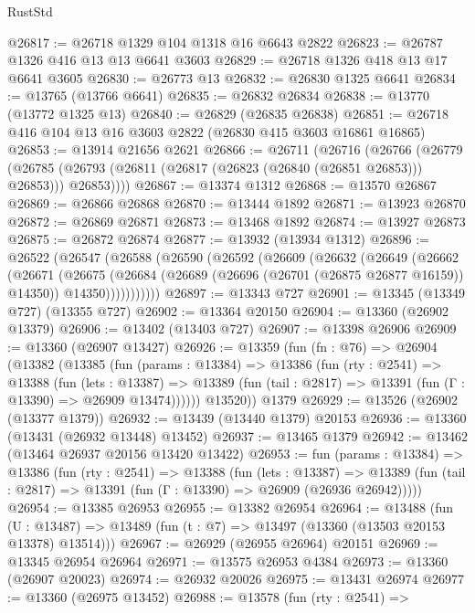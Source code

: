 \begin{lexlean}{RustStd}
\begin{coremodule}
@26817 := @26718 @1329 @104 @1318 @16 @6643 @2822
@26823 := @26787 @1326 @416 @13 @13 @6641 @3603
@26829 := @26718 @1326 @418 @13 @17 @6641 @3605
@26830 := @26773 @13
@26832 := @26830 @1325 @6641
@26834 := @13765 (@13766 @6641)
@26835 := @26832 @26834
@26838 := @13770 (@13772 @1325 @13)
@26840 := @26829 (@26835 @26838)
@26851 := @26718 @416 @104 @13 @16 @3603 @2822 (@26830 @415 @3603 @16861 @16865)
@26853 := @13914 @21656 @2621
@26866 := @26711
    (@26716
      (@26766
        (@26779
          (@26785 (@26793 (@26811 (@26817 (@26823 (@26840 (@26851 @26853))) @26853))) @26853))))
@26867 := @13374 @1312
@26868 := @13570 @26867
@26869 := @26866 @26868
@26870 := @13444 @1892
@26871 := @13923 @26870
@26872 := @26869 @26871
@26873 := @13468 @1892
@26874 := @13927 @26873
@26875 := @26872 @26874
@26877 := @13932 (@13934 @1312)
@26896 := @26522
    (@26547
      (@26588
        (@26590
          (@26592
            (@26609
              (@26632
                (@26649
                  (@26662
                    (@26671
                      (@26675
                        (@26684
                          (@26689 (@26696 (@26701 (@26875 @26877 @16159)) @14350))
                          @14350)))))))))))
@26897 := @13343 @727
@26901 := @13345 (@13349 @727) (@13355 @727)
@26902 := @13364 @20150
@26904 := @13360 (@26902 @13379)
@26906 := @13402 (@13403 @727)
@26907 := @13398 @26906
@26909 := @13360 (@26907 @13427)
@26926 := @13359
    (fun (fn : @76) =>
    @26904
      (@13382
        (@13385
          (fun (params : @13384) =>
          @13386
            (fun (rty : @2541) =>
            @13388
              (fun (lets : @13387) =>
              @13389 (fun (tail : @2817) => @13391 (fun (Γ : @13390) => @26909 @13474))))))
        @13520))
    @1379
@26929 := @13526 (@26902 (@13377 @1379))
@26932 := @13439 (@13440 @1379) @20153
@26936 := @13360 (@13431 (@26932 @13448) @13452)
@26937 := @13465 @1379
@26942 := @13462 (@13464 @26937 @20156 @13420 @13422)
@26953 := fun (params : @13384) =>
  @13386
    (fun (rty : @2541) =>
    @13388
      (fun (lets : @13387) =>
      @13389 (fun (tail : @2817) => @13391 (fun (Γ : @13390) => @26909 (@26936 @26942)))))
@26954 := @13385 @26953
@26955 := @13382 @26954
@26964 := @13488
    (fun (U : @13487) => @13489 (fun (t : @7) => @13497 (@13360 (@13503 @20153 @13378) @13514)))
@26967 := @26929 (@26955 @26964) @20151
@26969 := @13345 @26954 @26964
@26971 := @13575 @26953 @4384
@26973 := @13360 (@26907 @20023)
@26974 := @26932 @20026
@26975 := @13431 @26974
@26977 := @13360 (@26975 @13452)
@26988 := @13578
    (fun (rty : @2541) =>

\end{coremodule}
\end{lexlean}
